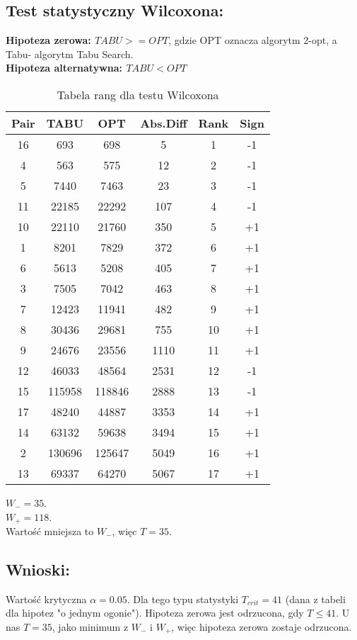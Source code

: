     \subsection{Test statystyczny Wilcoxona: }
    \textbf{Hipoteza zerowa: $TABU >= OPT$}, gdzie OPT oznacza algorytm 2-opt, a Tabu- algorytm Tabu Search. \\
    \textbf{Hipoteza alternatywna: $TABU < OPT$ }
    \begin{table}[H]
    \begin{tabular}{|c | c | c | c | c | c |} 
     \hline
     Pair & TABU & OPT & Abs.Diff & Rank & Sign \\ [0.5ex] 
     \hline\hline
      16 & 693 & 698 & 5 & 1 & -1 \\
      4 & 563 & 575 & 12 & 2 & -1 \\
      5 & 7440 & 7463 & 23 & 3 & -1 \\
      11 & 22185 & 22292 & 107 & 4 & -1 \\
      10 & 22110 & 21760 & 350 & 5 & +1 \\
      1 & 8201 & 7829 & 372 & 6 & +1 \\
      6 & 5613 & 5208 & 405 & 7 & +1 \\
      3 & 7505 & 7042 & 463 & 8 & +1 \\
      7 & 12423 & 11941 & 482 & 9 & +1 \\
      8 & 30436 & 29681 & 755 & 10 & +1 \\
      9 & 24676 & 23556 & 1110 & 11 & +1 \\
      12 & 46033 & 48564 & 2531 & 12 & -1 \\
      15 & 115958 & 118846 & 2888 & 13 & -1 \\ 
      17 & 48240 & 44887 & 3353 & 14 & +1 \\
      14 & 63132 & 59638 & 3494 & 15 & +1 \\
      2 & 130696 & 125647 & 5049 & 16 & +1 \\
      13 & 69337 & 64270 & 5067 & 17 & +1 \\
     \hline
    \end{tabular}
    \caption{Tabela rang dla testu Wilcoxona}
    \end{table}

    $W_{-} = 35$.\\
    $W_{+} = 118$. \\
    Wartość mniejsza to $W_{-}$, więc $T=35$.

  \subsection{Wnioski: }
  Wartość krytyczna $\alpha = 0.05$. Dla tego typu statystyki $T_{crit}=41$ (dana z tabeli dla hipotez "o jednym ogonie"). Hipoteza zerowa jest odrzucona, gdy $ T \leq 41 $. U nas $T=35$, jako minimum z $W_{-}$ i $W_{+}$, więc hipoteza zerowa zostaje odrzucona.